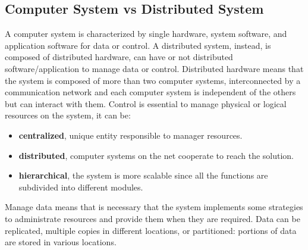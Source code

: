 \documentclass[11pt,a4paper]{article}
\begin{document}
\subsection{Computer System vs Distributed System}
A computer system is characterized by single hardware, system software, and application software for data or control. A distributed system, instead, is composed of distributed hardware, can have or not distributed software/application to manage data or control.
Distributed hardware means that the system is composed of more than two computer systems, interconnected by a communication network and each computer system is independent of the others but can interact with them.
Control is essential to manage physical or logical resources on the system, it can be:
\begin{itemize}
    \item \textbf{centralized}, unique entity responsible to manager resources.
    \item \textbf{distributed}, computer systems on the net cooperate to reach the solution.
    \item \textbf{hierarchical}, the system is more scalable since all the functions are subdivided into different modules.
\end{itemize}
Manage data means that is necessary that the system implements some strategies to administrate resources and provide them when they are required. Data can be replicated, multiple copies in different locations, or partitioned: portions of data are stored in various locations.
\end{document}
